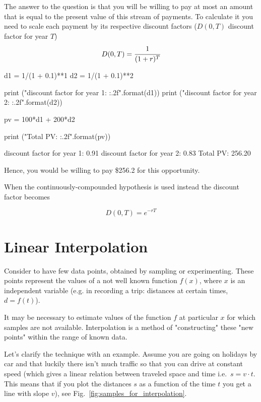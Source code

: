 The answer to the question is that you will be willing to pay at most an amount that is equal to the present value of this stream of payments. To calculate it you need to scale each payment by its respective discount factors ($D(0, T)$ discount factor for year $T$)
\begin{equation}
D(0, T) = \cfrac{1}{(1 + r)^T}
\label{eq:discount_factor}
\end{equation}

\begin{ipython}
d1 = 1/(1 + 0.1)**1
d2 = 1/(1 + 0.1)**2

print ("discount factor for year 1: {:.2f}".format(d1))
print ("discount factor for year 2: {:.2f}".format(d2))

pv = 100*d1 + 200*d2

print ("Total PV: {:.2f}".format(pv))
\end{ipython}
\begin{ioutput}
discount factor for year 1: 0.91
discount factor for year 2: 0.83
Total PV: 256.20
\end{ioutput}
\noindent
Hence, you would be willing to pay \$256.2 for this opportunity.

%
When the continuously-compounded hypothesis is used instead the discount factor becomes

\begin{equation}
D(0, T) = e^{-rT}
\end{equation}

\section{Linear Interpolation}
\label{linear-interpolation}

Consider to have few data points, obtained by sampling or experimenting. These points represent the values of a not well known function \(f(x)\), where \(x\) is an independent variable (e.g. in recording a trip: distances at certain times, \(d = f(t)\)).

It may be necessary to estimate values of the function $f$ at particular $x$ for which samples are not available. Interpolation is a method of "constructing" these "new points" within the range of known data.

Let's clarify the technique with an example.
Assume you are going on holidays by car and that luckily there isn't much traffic so that you can drive at constant speed (which gives a linear relation between traveled space and time i.e.~\(s = v \cdot t\). This means that if you plot the distances \(s\) as a function of the time \(t\) you get a line with slope \(v\)), see Fig.~\ref{fig:samples_for_interpolation}.

